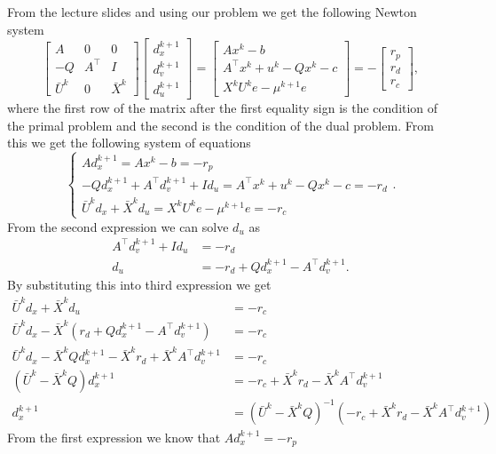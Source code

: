 \documentclass{article}
\begin{document}
	From the lecture slides and using our problem we get the following Newton system
	\begin{equation}
		\begin{bmatrix}
			A & 0 & 0\\
			-Q & A^\top & I\\
			\bar{U}^k & 0 & \bar{X}^k
		\end{bmatrix}
		\begin{bmatrix}
			d_x^{k+1}\\
			d_v^{k+1}\\
			d_u^{k+1}
		\end{bmatrix} =
		\begin{bmatrix}
			Ax^{k}-b \\
			A^\top x^k+ u^k -Qx^k-c\\
			X^k U^k e - \mu^{k+1}e
		\end{bmatrix} = -
		\begin{bmatrix}
			r_p\\
			r_d\\
			r_c
		\end{bmatrix},
	\end{equation}
	where the first row of the matrix after the first equality sign is the condition of the primal problem and the second is the condition of the dual problem. From this we get the following system of equations
	\begin{equation}
		\begin{cases}
			Ad_x^{k+1} = Ax^{k}-b = -r_p \\
			-Qd_x^{k+1}+A^\top d_v^{k+1} + Id_u = A^\top x^k+ u^k -Qx^k-c = -r_d\\
			\bar{U}^kd_x + \bar{X}^kd_u= X^k U^k e - \mu^{k+1}e = -r_c
		\end{cases}.
	\end{equation}
	From the second expression we can solve $d_u$ as 
	\begin{align}
		A^\top d_v^{k+1} + Id_u &= -r_d\\
		d_u &= -r_d +Qd_x^{k+1}- A^\top d_v^{k+1}.
	\end{align}
	By substituting this into third expression we get
	\begin{align}
		\bar{U}^kd_x + \bar{X}^kd_u &= -r_c\\
		\bar{U}^kd_x - \bar{X}^k(r_d +Qd_x^{k+1}- A^\top d_v^{k+1}) &= -r_c\\
		\bar{U}^kd_x - \bar{X}^kQd_x^{k+1} - \bar{X}^kr_d +\bar{X}^kA^\top d_v^{k+1} &= -r_c\\
		(\bar{U}^k - \bar{X}^kQ)d_x^{k+1} &= -r_c + \bar{X}^kr_d -\bar{X}^kA^\top d_v^{k+1}\\
		d_x^{k+1} &= (\bar{U}^k - \bar{X}^kQ) ^{-1}(-r_c + \bar{X}^kr_d -\bar{X}^kA^\top d_v^{k+1})
	\end{align}
	From the first expression we know that	$Ad_x^{k+1}  = -r_p$
\end{document}

